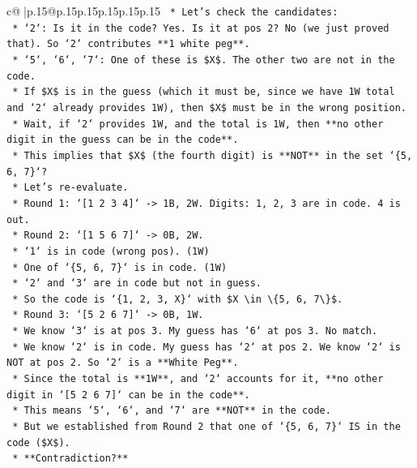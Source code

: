 \documentclass{article}
\begin{document}
{\begin{supertabular}{c@{$\;$}|p{.15\linewidth}@{}p{.15\linewidth}p{.15\linewidth}p{.15\linewidth}p{.15\linewidth}p{.15\linewidth}}
{{{\texttt{    *   Let's check the candidates:} \\
\texttt{        *   `2`: Is it in the code? Yes. Is it at pos 2? No (we just proved that). So `2` contributes **1 white peg**.} \\
\texttt{        *   `5`, `6`, `7`: One of these is \$X\$. The other two are not in the code.} \\
\texttt{        *   If \$X\$ is in the guess (which it must be, since we have 1W total and `2` already provides 1W), then \$X\$ must be in the wrong position.} \\
\texttt{        *   Wait, if `2` provides 1W, and the total is 1W, then **no other digit in the guess can be in the code**.} \\
\texttt{        *   This implies that \$X\$ (the fourth digit) is **NOT** in the set `\{5, 6, 7\}`?} \\
\texttt{        *   Let's re{-}evaluate.} \\
\texttt{        *   Round 1: `{[}1 2 3 4{]}` {-}> 1B, 2W. Digits: 1, 2, 3 are in code. 4 is out.} \\
\texttt{        *   Round 2: `{[}1 5 6 7{]}` {-}> 0B, 2W.} \\
\texttt{            *   `1` is in code (wrong pos). (1W)} \\
\texttt{            *   One of `\{5, 6, 7\}` is in code. (1W)} \\
\texttt{            *   `2` and `3` are in code but not in guess.} \\
\texttt{            *   So the code is `\{1, 2, 3, X\}` with \$X \textbackslash{}in \textbackslash{}\{5, 6, 7\textbackslash{}\}\$.} \\
\texttt{        *   Round 3: `{[}5 2 6 7{]}` {-}> 0B, 1W.} \\
\texttt{            *   We know `3` is at pos 3. My guess has `6` at pos 3. No match.} \\
\texttt{            *   We know `2` is in code. My guess has `2` at pos 2. We know `2` is NOT at pos 2. So `2` is a **White Peg**.} \\
\texttt{            *   Since the total is **1W**, and `2` accounts for it, **no other digit in `{[}5 2 6 7{]}` can be in the code**.} \\
\texttt{            *   This means `5`, `6`, and `7` are **NOT** in the code.} \\
\texttt{            *   But we established from Round 2 that one of `\{5, 6, 7\}` IS in the code (\$X\$).} \\
\texttt{            *   **Contradiction?**} \\
}}}
\end{supertabular}}
\end{document}
